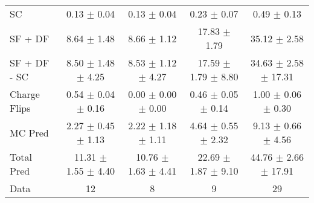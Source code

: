 \begin{tabular}{l|cccc}
                                 SC &  0.13 $\pm$  0.04 &  0.13 $\pm$  0.04 &  0.23 $\pm$  0.07 &  0.49 $\pm$  0.13 \\
                            SF + DF &  8.64 $\pm$  1.48 &  8.66 $\pm$  1.12 & 17.83 $\pm$  1.79 & 35.12 $\pm$  2.58 \\
\hline
                       SF + DF - SC &  8.50 $\pm$  1.48 $\pm$  4.25 &  8.53 $\pm$  1.12 $\pm$  4.27 & 17.59 $\pm$  1.79 $\pm$  8.80 & 34.63 $\pm$  2.58 $\pm$ 17.31 \\
\hline\hline
                       Charge Flips &  0.54 $\pm$  0.04 $\pm$  0.16 &  0.00 $\pm$  0.00 $\pm$  0.00 &  0.46 $\pm$  0.05 $\pm$  0.14 &  1.00 $\pm$  0.06 $\pm$  0.30 \\
\hline
                            MC Pred &  2.27 $\pm$  0.45 $\pm$  1.13 &  2.22 $\pm$  1.18 $\pm$  1.11 &  4.64 $\pm$  0.55 $\pm$  2.32 &  9.13 $\pm$  0.66 $\pm$  4.56 \\
\hline
                         Total Pred & 11.31 $\pm$  1.55 $\pm$  4.40 & 10.76 $\pm$  1.63 $\pm$  4.41 & 22.69 $\pm$  1.87 $\pm$  9.10 & 44.76 $\pm$  2.66 $\pm$ 17.91 \\
\hline\hline
                               Data &    12 &     8 &     9 &    29 \\
\hline\hline
\end{tabular}

